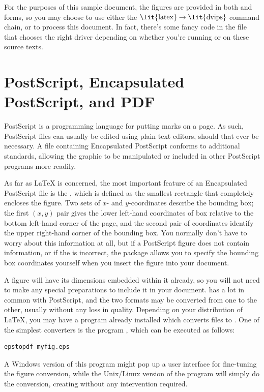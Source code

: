 For the purposes of this sample document, the figures are provided in
both  and  forms, so you may choose to use either
the $\mbox{\lit{latex}}\rightarrow\mbox{\lit{dvips}}$ command chain,
or  to process this document. In fact, there's some
fancy code in the  file that chooses the right driver
depending on whether you're running  or  on
these source texts.

\section{PostScript, Encapsulated PostScript, and PDF}
PostScript is a programming language for putting marks on a page.  As
such, PostScript files can usually be edited using plain text editors,
should that ever be necessary.  A file containing Encapsulated
PostScript conforms to additional standards, allowing the graphic to
be manipulated or included in other PostScript programs more readily.

As far as \LaTeX{} is concerned, the most important feature of an
Encapsulated PostScript file is the , which is
defined as the smallest rectangle that completely encloses the figure.
Two sets of $x$- and $y$-coordinates describe the bounding box; the
first $(x,y)$ pair gives the lower left-hand coordinates of box
relative to the bottom left-hand corner of the page, and the second
pair of coordinates identify the upper right-hand corner of the
bounding box.  You normally don't have to worry about this information
at all, but if a PostScript figure does not contain
 information, or if the  is
incorrect, the  package allows you to specify the
bounding box coordinates yourself when you insert the figure into your
document.

A  figure will have its dimensions embedded within it
already, so you will not need to make any special preparations to
include it in your document.  has a lot in common with
PostScript, and the two formats may be converted from one to the
other, usually without any loss in quality.  Depending on your
distribution of \LaTeX, you may have a program already installed which
converts  files to .  One of the simplest
converters is the program , which can be executed as
follows:
\begin{verbatim}
epstopdf myfig.eps
\end{verbatim}
A Windows version of this program might pop up a user interface for
fine-tuning the figure conversion, while the Unix/Linux version of the
program will simply do the conversion, creating 
without any intervention required.

